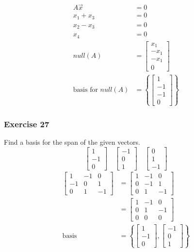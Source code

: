 \documentclass[letterpaper, 12pt]{math}
\begin{document}
\begin{align*}
  A\vec{x} &= 0 \\
  x_1+x_3 &= 0 \\
  x_2-x_3 &= 0 \\
  x_4 &= 0 \\
  null(A) &= \begin{bmatrix}
    x_1 \\ -x_1 \\ -x_1 \\ 0
  \end{bmatrix} \\
  \text{basis for } null(A) &= \left\{
    \begin{bmatrix}1 \\ -1 \\ -1 \\ 0\end{bmatrix}\right\}
\end{align*}

\subsubsection*{Exercise 27}
Find a basis for the span of the given vectors.
\[ \begin{bmatrix}1 \\ -1 \\ 0\end{bmatrix}\quad
  \begin{bmatrix}-1 \\ 0 \\ 1\end{bmatrix}\quad
  \begin{bmatrix}0 \\ 1 \\ -1\end{bmatrix} \]
\begin{align*}
  \begin{bmatrix}
    1 & -1 & 0 \\
    -1 & 0 & 1 \\
    0 & 1 & -1
  \end{bmatrix} &= \begin{bmatrix}
    1 & -1 & 0 \\
    0 & -1 & 1 \\
    0 & 1 & -1
  \end{bmatrix} \\
  &= \begin{bmatrix}
    1 & -1 & 0 \\
    0 & 1 & -1 \\
    0 & 0 & 0
  \end{bmatrix} \\
  \text{basis} &= \left\{\begin{bmatrix}
    1 \\ -1 \\ 0
  \end{bmatrix},\begin{bmatrix}
    -1 \\ 0 \\ 1
  \end{bmatrix}\right\}
\end{align*}
\end{document}
